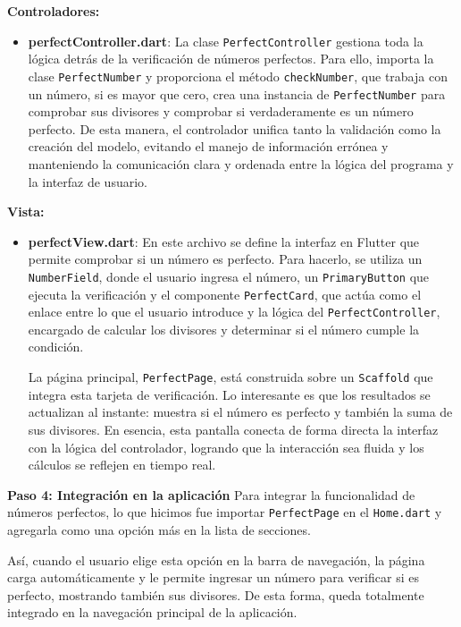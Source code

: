 \textbf{Controladores:}  

\begin{itemize}
    \item \textbf{perfectController.dart}: La clase \texttt{PerfectController} gestiona toda la lógica detrás de la verificación de números perfectos. Para ello, importa la clase \texttt{PerfectNumber} y proporciona el método \texttt{checkNumber}, que trabaja con un número, si es mayor que cero, crea una instancia de \texttt{PerfectNumber} para comprobar sus divisores y comprobar si verdaderamente es un número perfecto. De esta manera, el controlador unifica tanto la validación como la creación del modelo, evitando el manejo de información errónea y manteniendo la comunicación clara y ordenada entre la lógica del programa y la interfaz de usuario.
\end{itemize}

\textbf{Vista:}  

\begin{itemize}
    \item \textbf{perfectView.dart}: En este archivo se define la interfaz en Flutter que permite comprobar si un número es perfecto. Para hacerlo, se utiliza un \texttt{NumberField}, donde el usuario ingresa el número, un \texttt{PrimaryButton} que ejecuta la verificación y el componente \texttt{PerfectCard}, que actúa como el enlace entre lo que el usuario introduce y la lógica del \texttt{PerfectController}, encargado de calcular los divisores y determinar si el número cumple la condición.
    
    La página principal, \texttt{PerfectPage}, está construida sobre un \texttt{Scaffold} que integra esta tarjeta de verificación. Lo interesante es que los resultados se actualizan al instante: muestra si el número es perfecto y también la suma de sus divisores. En esencia, esta pantalla conecta de forma directa la interfaz con la lógica del controlador, logrando que la interacción sea fluida y los cálculos se reflejen en tiempo real.
\end{itemize}

\textbf{Paso 4: Integración en la aplicación}  
Para integrar la funcionalidad de números perfectos, lo que hicimos fue importar \texttt{PerfectPage} en el \texttt{Home.dart} y agregarla como una opción más en la lista de secciones.

Así, cuando el usuario elige esta opción en la barra de navegación, la página carga automáticamente y le permite ingresar un número para verificar si es perfecto, mostrando también sus divisores. De esta forma, queda totalmente integrado en la navegación principal de la aplicación.